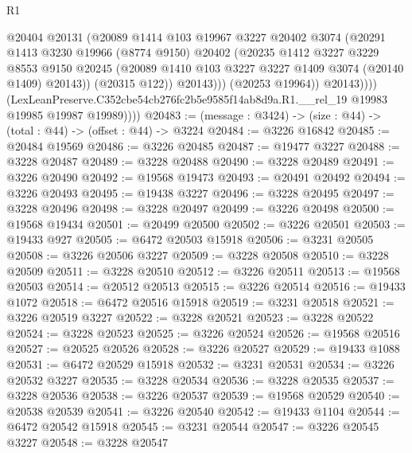 \begin{lexlean}{R1}
\begin{coremodule}
                        @20404
                        @20131
                        (@20089
                          @1414
                          @103
                          @19967
                          @3227
                          @20402
                          @3074
                          (@20291
                            @1413
                            @3230
                            @19966
                            (@8774 @9150)
                            @20402
                            (@20235
                              @1412
                              @3227
                              @3229
                              @8553
                              @9150
                              @20245
                              (@20089 @1410 @103 @3227 @3227 @1409 @3074 (@20140 @1409) @20143))
                            (@20315 @122))
                          @20143)))
                    (@20253 @19964))
                  @20143))))
          (LexLeanPreserve.C352cbe54cb276fc2b5e9585f14ab8d9a.R1.__rel_19
            @19983
            @19985
            @19987
            @19989))))
@20483 := (message : @3424) -> (size : @44) -> (total : @44) -> (offset : @44) -> @3224
@20484 := @3226 @16842
@20485 := @20484 @19569
@20486 := @3226 @20485
@20487 := @19477 @3227
@20488 := @3228 @20487
@20489 := @3228 @20488
@20490 := @3228 @20489
@20491 := @3226 @20490
@20492 := @19568 @19473
@20493 := @20491 @20492
@20494 := @3226 @20493
@20495 := @19438 @3227
@20496 := @3228 @20495
@20497 := @3228 @20496
@20498 := @3228 @20497
@20499 := @3226 @20498
@20500 := @19568 @19434
@20501 := @20499 @20500
@20502 := @3226 @20501
@20503 := @19433 @927
@20505 := @6472 @20503 @15918
@20506 := @3231 @20505
@20508 := @3226 @20506 @3227
@20509 := @3228 @20508
@20510 := @3228 @20509
@20511 := @3228 @20510
@20512 := @3226 @20511
@20513 := @19568 @20503
@20514 := @20512 @20513
@20515 := @3226 @20514
@20516 := @19433 @1072
@20518 := @6472 @20516 @15918
@20519 := @3231 @20518
@20521 := @3226 @20519 @3227
@20522 := @3228 @20521
@20523 := @3228 @20522
@20524 := @3228 @20523
@20525 := @3226 @20524
@20526 := @19568 @20516
@20527 := @20525 @20526
@20528 := @3226 @20527
@20529 := @19433 @1088
@20531 := @6472 @20529 @15918
@20532 := @3231 @20531
@20534 := @3226 @20532 @3227
@20535 := @3228 @20534
@20536 := @3228 @20535
@20537 := @3228 @20536
@20538 := @3226 @20537
@20539 := @19568 @20529
@20540 := @20538 @20539
@20541 := @3226 @20540
@20542 := @19433 @1104
@20544 := @6472 @20542 @15918
@20545 := @3231 @20544
@20547 := @3226 @20545 @3227
@20548 := @3228 @20547

\end{coremodule}
\end{lexlean}
